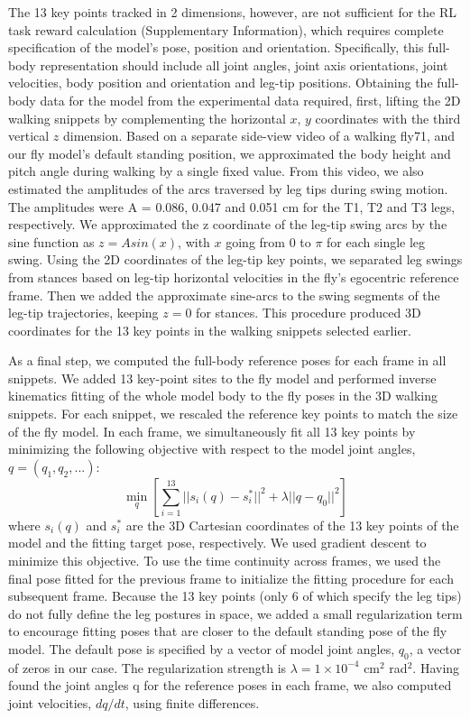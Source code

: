 \documentclass[sn-mathphys-num]{sn-jnl}%
\theoremstyle{thmstyleone}%
\theoremstyle{thmstyletwo}%
\theoremstyle{thmstylethree}%
\begin{document}
The 13 key points tracked in 2 dimensions, however, are not sufficient for the RL task reward calculation (Supplementary Information), which requires complete specification of the model’s pose, position and orientation. 
Specifically, this full-body representation should include all joint angles, joint axis orientations, joint velocities, body position and orientation and leg-tip positions. 
Obtaining the full-body data for the model from the experimental data required, first, lifting the 2D walking snippets by complementing the horizontal $ x $, $ y $ coordinates with the third vertical $ z $ dimension.
Based on a separate side-view video of a walking fly71, and our fly model’s default standing position, we approximated the body height and pitch angle during walking by a single fixed value. 
From this video, we also estimated the amplitudes of the arcs traversed by leg tips during swing motion. 
The amplitudes were A = 0.086, 0.047 and 0.051 cm for the T1, T2 and T3 legs, respectively. 
We approximated the z coordinate of the leg-tip swing arcs by the sine function as $ z = A sin(x) $, with $ x $ going from 0 to $ \pi $ for each single leg swing.
Using the 2D coordinates of the leg-tip key points, we separated leg swings from stances based on leg-tip horizontal velocities in the fly’s egocentric reference frame. 
Then we added the approximate sine-arcs to the swing segments of the leg-tip trajectories, keeping $ z = 0 $ for stances.
This procedure produced 3D coordinates for the 13 key points in the walking snippets selected earlier.


As a final step, we computed the full-body reference poses for each frame in all snippets. 
We added 13 key-point sites to the fly model and performed inverse kinematics fitting of the whole model body to the fly poses in the 3D walking snippets. 
For each snippet, we rescaled the reference key points to match the size of the fly model. 
In each frame, we simultaneously fit all 13 key points by minimizing the following objective with respect to the model joint angles, $ q = (q_1, q_2, ...) $:
\begin{equation}\label{key}
	\min_{q} [ 
		\sum_{i=1}^{13} || s_i (q) - s_i^{*} ||^2
		+ \lambda || q - q_0 ||^2
	 ]
\end{equation}
%
where $ s_i(q) $ and $ s_i^{*} $ are the 3D Cartesian coordinates of the 13 key points of the model and the fitting target pose, respectively. 
We used gradient descent to minimize this objective. 
To use the time continuity across frames, we used the final pose fitted for the previous frame to initialize the fitting procedure for each subsequent frame. 
Because the 13 key points (only 6 of which specify the leg tips) do not fully define the leg postures in space, we added a small regularization term to encourage fitting poses that are closer to the default standing pose of the fly model. 
The default pose is specified by a vector of model joint angles, $ q_0 $, a vector of zeros in our case. 
The regularization strength is $ \lambda = 1 \times 10^{-4} $ cm$ ^2 $ rad$ ^2 $.
Having found the joint angles q for the reference poses in each frame, we also computed joint velocities, $ dq/dt $, using finite differences.
\end{document}

